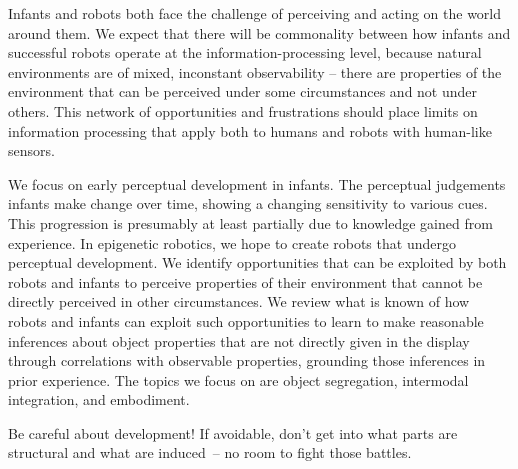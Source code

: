 
Infants and robots both face the challenge of perceiving and acting on
the world around them.  
%
%
%
We expect
that there will be commonality between how infants and successful
robots operate at the information-processing level, because natural
environments are of mixed, inconstant observability -- there are
properties of the environment that can be perceived under some
circumstances and not under others.  This network of opportunities and
frustrations should place limits on information processing that apply
both to humans and robots with human-like sensors.

We focus on early perceptual development in infants.  The
perceptual judgements infants make change over time, showing
a changing sensitivity to various cues. This progression
is presumably at least partially due to knowledge gained
from experience.  In epigenetic robotics, we hope to 
create robots that undergo perceptual development.
%
%
%
We identify opportunities that can be exploited by both robots and
infants to perceive properties of their environment that cannot be
directly perceived in other circumstances.  We review what is known of
how robots and infants can exploit such opportunities to learn to make
reasonable inferences 
%
%
about object properties that are not directly given in the display
%
through correlations
with observable properties, grounding those inferences in prior
experience.
%
The topics we focus on are object segregation,
intermodal integration, and embodiment.








Be careful about development!  If avoidable, don't get into what parts are
structural and what are induced~-- no room to fight those battles.

